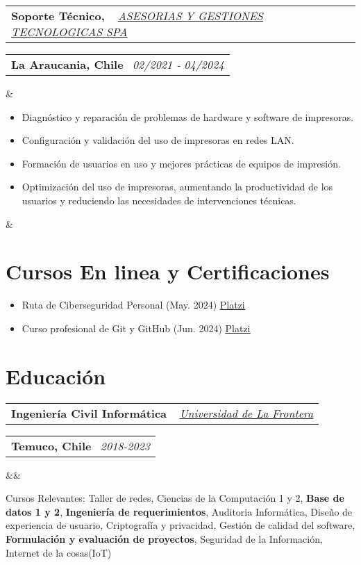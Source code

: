 \documentclass[11pt,a4paper,sans]{moderncv}
\makeatletter
\newcommand{\sectionMargin}{-3mm}
\newcommand*{\customcventry}[7][.13em]{
    \begin{tabular}{@{}l}
    {\bfseries #4} \
    {\itshape #3}
    \end{tabular}
    \hfill
    \begin{tabular}{l@{}}
    {\bfseries #5} \
    {\itshape #2}
    \end{tabular}
    \ifx&#7&%
    \else{\
    \begin{minipage}{\maincolumnwidth}%
    \small#7%
    \end{minipage}}\fi%
    \par\addvspace{#1}
}
\makeatother
\begin{document}
{\customcventry
    {02/2021 ‐ 04/2024}
    {{ \href{http://www.tisol.cl/}{\underline{ASESORIAS Y GESTIONES TECNOLOGICAS SPA}} }}
    {Soporte Técnico,}
    {La Araucania, Chile}{}
    {{\begin{itemize}[leftmargin=0.6cm, noitemsep, label={\textbullet}]
        \item Diagnóstico y reparación de problemas de hardware y software de impresoras.
        \item Configuración y validación del uso de impresoras en redes LAN.
        \item Formación de usuarios en uso y mejores prácticas de equipos de impresión.
        \item Optimización del uso de impresoras, aumentando la productividad de los usuarios y reduciendo las necesidades de intervenciones técnicas.
    \end{itemize}}
}
}

\vspace*{\sectionMargin}

\section{Cursos En linea y Certificaciones}{
\begin{itemize}[label=\textbullet, noitemsep]
    \item Ruta de Ciberseguridad Personal (May. 2024) \href{https://1drv.ms/b/c/13c8ae619d64655e/EZYaMe6SBhJAshtvq4ORCQoBwWMYRerI4_xiuqXjORVd0w?e=I4tLqg}{\underline{Platzi}}
    \item Curso profesional de Git y GitHub (Jun. 2024) \href{https://1drv.ms/b/c/13c8ae619d64655e/EXeQGPrTCjFDpmx8pCItVTwB-OS1r-tkKJbmgYnahuxtYg?e=mc9YcH}{\underline{Platzi}}
\end{itemize}
}

\vspace*{-6mm}

\section{Educación}{
\customcventry
    {2018-2023}
    { \href{https://1drv.ms/b/c/13c8ae619d64655e/EV5lZJ1hrsgggBOHLAAAAAABHh9OZUbWLd2nx7PTa_OSsg?e=Fedmge}
    {\underline{Universidad de La Frontera}} }
    {Ingeniería Civil Informática}
    {Temuco, Chile}{}{}
    {Cursos Relevantes: 
        {Taller de redes}, 
        {Ciencias de la Computación} 1 y 2, 
        \textbf{Base de datos 1 y 2}, 
        \textbf{Ingeniería de requerimientos},
        {Auditoria Informática}, 
        {Diseño de experiencia de usuario}, 
        {Criptografía y privacidad}, 
        Gestión de {calidad del software}, 
        \textbf{Formulación y evaluación de proyectos},
        {Seguridad de la Información},
        Internet de la cosas{(IoT)}
}
}
\end{document}
